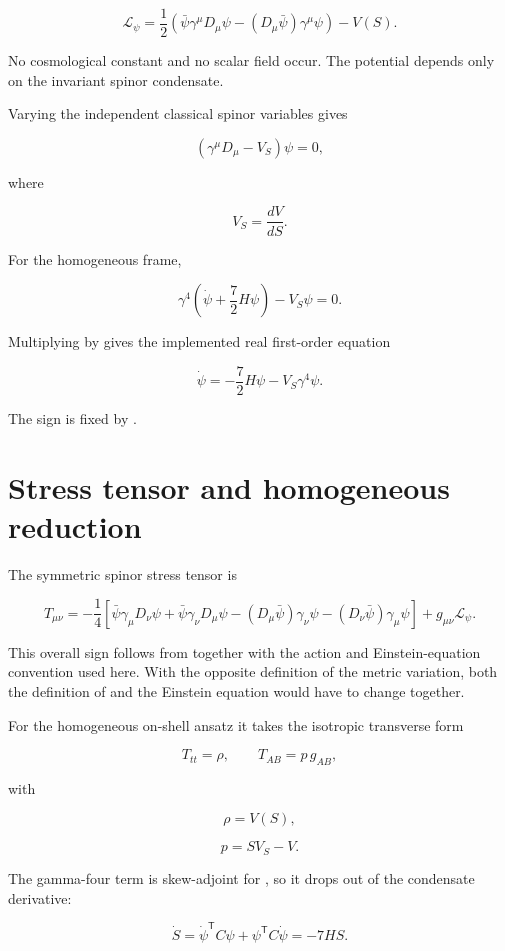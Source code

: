 \documentclass[11pt]{article}
\begin{document}
\[
\mathcal L_\psi
=\frac12\left(
\bar\psi\gamma^\mu D_\mu\psi
-(D_\mu\bar\psi)\gamma^\mu\psi
\right)-V(S).
\]

No cosmological constant and no scalar field occur. The potential depends only on the invariant spinor condensate.

Varying the independent classical spinor variables gives

\[
\boxed{(\gamma^\mu D_\mu-V_S)\psi=0,}
\]

where

\[
V_S=\frac{dV}{dS}.
\]

For the homogeneous frame,

\[
\gamma^4\left(\dot\psi+\frac72H\psi\right)-V_S\psi=0.
\]

Multiplying by \texttt{} gives the implemented real first-order equation

\[
\boxed{
\dot\psi=-\frac72H\psi-V_S\gamma^4\psi.}
\]

The sign is fixed by \texttt{}.

\section{Stress tensor and homogeneous reduction}

The symmetric spinor stress tensor is

\[
T_{\mu\nu}
=-\frac14\left[
\bar\psi\gamma_\mu D_\nu\psi
+\bar\psi\gamma_\nu D_\mu\psi
-(D_\mu\bar\psi)\gamma_\nu\psi
-(D_\nu\bar\psi)\gamma_\mu\psi
\right]+g_{\mu\nu}\mathcal L_\psi.
\]

This overall sign follows from \texttt{} together with the action and Einstein-equation convention used here. With the opposite definition of the metric variation, both the definition of \texttt{} and the Einstein equation would have to change together.

For the homogeneous on-shell ansatz it takes the isotropic transverse form

\[
T_{tt}=\rho,
\qquad
T_{AB}=p\,g_{AB},
\]

with

\[
\boxed{\rho=V(S),}
\]

\[
\boxed{p=S V_S-V.}
\]

The gamma-four term is skew-adjoint for \texttt{}, so it drops out of the condensate derivative:

\[
\dot S
=\dot\psi^{\mathsf T}C\psi+\psi^{\mathsf T}C\dot\psi
=-7HS.
\]
\end{document}

